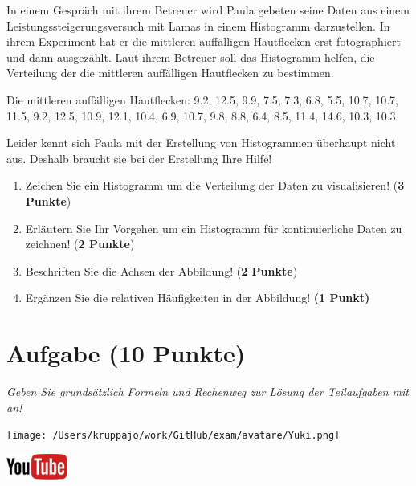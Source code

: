 \documentclass[a4paper, 9pt]{scrartcl}\usepackage[]{graphicx}\usepackage[]{xcolor}
\begin{document}
In einem Gespräch mit ihrem Betreuer wird Paula gebeten seine Daten aus einem Leistungssteigerungsversuch mit Lamas in einem Histogramm darzustellen. In ihrem Experiment hat er die mittleren auffälligen Hautflecken erst fotographiert und dann ausgezählt. Laut ihrem Betreuer soll das Histogramm helfen, die Verteilung der die mittleren auffälligen Hautflecken zu bestimmen.

\begin{center}
Die mittleren auffälligen Hautflecken: 9.2, 12.5, 9.9, 7.5, 7.3, 6.8, 5.5, 10.7, 10.7, 11.5, 9.2, 12.5, 10.9, 12.1, 10.4, 6.9, 10.7, 9.8, 8.8, 6.4, 8.5, 11.4, 14.6, 10.3, 10.3
\end{center}

Leider kennt sich Paula mit der Erstellung von Histogrammen überhaupt nicht aus. Deshalb braucht sie bei der Erstellung Ihre Hilfe!

\begin{enumerate}
\item Zeichen Sie ein Histogramm um die Verteilung der Daten zu
  visualisieren! (\textbf{3 Punkte})
 \item Erläutern Sie Ihr Vorgehen um ein Histogramm für kontinuierliche
  Daten zu zeichnen!  (\textbf{2 Punkte})
\item Beschriften Sie die Achsen der Abbildung! (\textbf{2 Punkte})
\item Ergänzen Sie die relativen Häufigkeiten in der Abbildung! \textbf{(1
    Punkt)}  
\end{enumerate}

 
\clearpage

\section{Aufgabe \hfill (10 Punkte)}

\textit{Geben Sie grundsätzlich Formeln und Rechenweg zur Lösung der Teilaufgaben mit an!} \\[1Ex]
 

 
\begin{minipage}[t]{0.5\textwidth}
\texttt{[image: /Users/kruppajo/work/GitHub/exam/avatare/Yuki.png]}
\end{minipage}
\begin{minipage}[t]{0.5\textwidth}
\hfill
\href{https://youtu.be/VAqiUdV4WQ0}{\includegraphics[width = 2cm]{img/youtube}}\\[1Ex]
\end{minipage}
\vspace{1ex}
\end{document}
